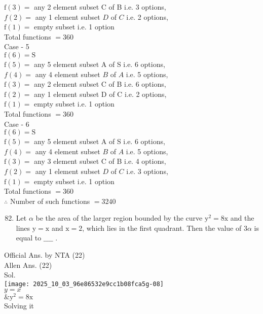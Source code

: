\documentclass[10pt]{article}
\begin{document}
\begin{itemize}
\(\mathrm{f}(3)=\) any 2 element subset C of B i.e. 3 options,\\
\(f(2)=\) any 1 element subset \(D\) of \(C\) i.e. 2 options,\\
\(\mathrm{f}(1)=\) empty subset i.e. 1 option\\
Total functions \(=360\)\\
Case - 5\\
\(\mathrm{f}(6)=\mathrm{S}\)\\
\(\mathrm{f}(5)=\) any 5 element subset A of S i.e. 6 options,\\
\(f(4)=\) any 4 element subset \(B\) of \(A\) i.e. 5 options,\\
\(\mathrm{f}(3)=\) any 2 element subset C of B i.e. 6 options,\\
\(\mathrm{f}(2)=\) any 1 element subset D of C i.e. 2 options,\\
\(\mathrm{f}(1)=\) empty subset i.e. 1 option\\
Total functions \(=360\)\\
Case - 6\\
\(\mathrm{f}(6)=\mathrm{S}\)\\
\(\mathrm{f}(5)=\) any 5 element subset A of S i.e. 6 options,\\
\(f(4)=\) any 4 element subset \(B\) of \(A\) i.e. 5 options,\\
\(\mathrm{f}(3)=\) any 3 element subset C of B i.e. 4 options,\\
\(f(2)=\) any 1 element subset \(D\) of \(C\) i.e. 3 options,\\
\(\mathrm{f}(1)=\) empty subset i.e. 1 option\\
Total functions \(=360\)\\
\(\therefore\) Number of such functions \(=3240\)
\end{itemize}

\begin{enumerate}
  \setcounter{enumi}{81}
  \item Let \(\alpha\) be the area of the larger region bounded by the curve \(\mathrm{y}^{2}=8 \mathrm{x}\) and the lines \(\mathrm{y}=\mathrm{x}\) and \(\mathrm{x}=2\), which lies in the first quadrant. Then the value of \(3 \alpha\) is equal to \(\_\_\_\_\) .
\end{enumerate}

Official Ans. by NTA (22)\\
Allen Ans. (22)\\
Sol.\\
\texttt{[image: 2025\_10\_03\_96e86532e9cc1b08fca5g-08]}\\
\(y=x\)\\
\(\& \mathrm{y}^{2}=8 \mathrm{x}\)\\
Solving it
\end{document}
